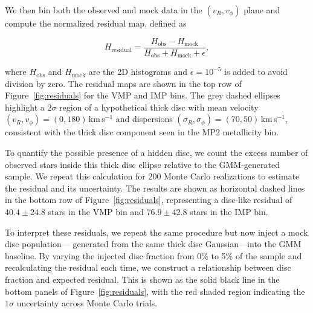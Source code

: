 \documentclass[a4paper,12pt]{article}
\begin{document}
We then bin both the observed and mock data in the $(v_R, v_\phi)$ plane and compute the 
normalized residual map, defined as

\[
H_{\mathrm{residual}} = \frac{H_{\mathrm{obs}} - H_{\mathrm{mock}}}{H_{\mathrm{obs}} + H_{\mathrm{mock}} + \epsilon},
\]

where $H_{\mathrm{obs}}$ and $H_{\mathrm{mock}}$ are the 2D histograms and $\epsilon = 10^{-5}$ is added 
to avoid division by zero. The residual maps are shown in the top row of Figure~\ref{fig:residuals} for 
the VMP and IMP bins. The grey dashed ellipses highlight a $2\sigma$ region of a hypothetical thick disc 
with mean velocity $(v_R, v_\phi) = (0, 180)$\,km\,s$^{-1}$ and dispersions $(\sigma_R, \sigma_\phi) 
= (70, 50)$\,km\,s$^{-1}$, consistent with the thick disc component seen in the MP2 metallicity bin.

To quantify the possible presence of a hidden disc, we count the excess number of observed stars inside 
this thick disc ellipse relative to the GMM-generated sample. We repeat this calculation for 200 Monte 
Carlo realizations to estimate the residual and its uncertainty. The results are shown as horizontal 
dashed lines in the bottom row of Figure~\ref{fig:residuals}, representing a disc-like residual 
of $40.4 \pm 24.8$ stars in the VMP bin and $76.9 \pm 42.8$ stars in the IMP bin.

To interpret these residuals, we repeat the same procedure but now inject a mock disc population—
generated from the same thick disc Gaussian—into the GMM baseline. By varying the injected disc 
fraction from 0\% to 5\% of the sample and recalculating the residual each time, we construct a 
relationship between disc fraction and expected residual. This is shown as the solid black line in the 
bottom panels of Figure~\ref{fig:residuals}, with the red shaded region indicating the $1\sigma$ 
uncertainty across Monte Carlo trials.
\end{document}
